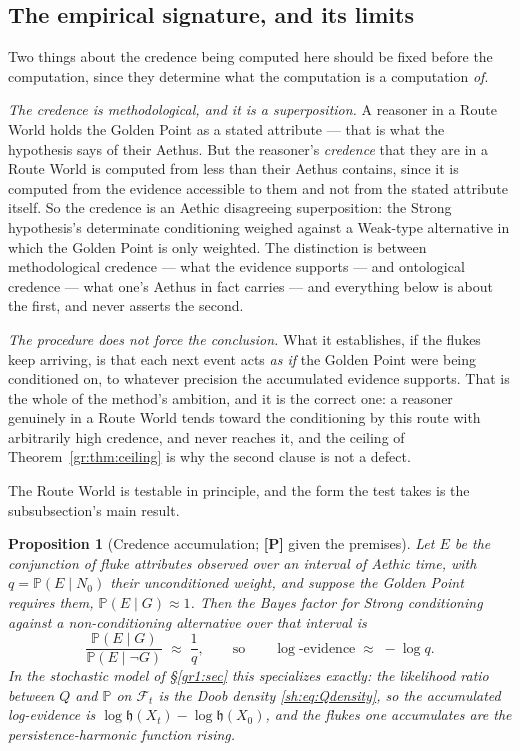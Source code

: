 \documentclass[11pt]{article}
\numberwithin{equation}{section}
\theoremstyle{plain}
\newtheorem{proposition}[theorem]{Proposition}
\theoremstyle{definition}
\theoremstyle{remark}
\newcommand{\PP}{\mathbb{P}}
\newcommand{\Fc}{\mathcal{F}}
\newcommand{\hm}{\mathfrak{h}}
\begin{document}
\subsection{The empirical signature, and its limits}\label{gc:sub:credencemethod}

Two things about the credence being computed here should be fixed before
the computation, since they determine what the computation is a
computation \emph{of}.

\emph{The credence is methodological, and it is a superposition.} A
reasoner in a Route World holds the Golden Point as a stated attribute
--- that is what the hypothesis says of their Aethus. But the reasoner's
\emph{credence} that they are in a Route World is computed from less
than their Aethus contains, since it is computed from the evidence
accessible to them and not from the stated attribute itself. So the
credence is an Aethic disagreeing superposition: the Strong hypothesis's
determinate conditioning weighed against a Weak-type alternative in which
the Golden Point is only weighted. The distinction is between
methodological credence --- what the evidence supports --- and
ontological credence --- what one's Aethus in fact carries --- and
everything below is about the first, and never asserts the second.

\emph{The procedure does not force the conclusion.} What it establishes,
if the flukes keep arriving, is that each next event acts \emph{as if}
the Golden Point were being conditioned on, to whatever precision the
accumulated evidence supports. That is the whole of the method's
ambition, and it is the correct one: a reasoner genuinely in a Route
World tends toward the conditioning by this route with arbitrarily high
credence, and never reaches it, and the ceiling of
Theorem~\ref{gr:thm:ceiling} is why the second clause is not a defect.

The Route World is testable in
principle, and the form the test takes is the subsubsection's main
result.

\begin{proposition}[Credence accumulation; \textbf{[P]} given the
premises]\label{gc:prop:credence}
Let $E$ be the conjunction of fluke attributes observed over an interval
of Aethic time, with $q=\PP(E\mid N_0)$ their unconditioned weight, and
suppose the Golden Point requires them, $\PP(E\mid G)\approx1$. Then the
Bayes factor for Strong conditioning against a non-conditioning
alternative over that interval is
\begin{equation}\label{gc:eq:bayesq}
\frac{\PP(E\mid G)}{\PP(E\mid \neg G)}\;\approx\;\frac1q,
\qquad\text{so}\qquad
\log\text{-evidence}\;\approx\;-\log q .
\end{equation}
In the stochastic model of \S\ref{gr1:sec} this specializes exactly:
the likelihood ratio between $Q$ and $\PP$ on $\Fc_t$ is the Doob
density \eqref{sh:eq:Qdensity}, so the accumulated log-evidence is
$\log\hm(X_t)-\log\hm(X_0)$, and \emph{the flukes one accumulates are
the persistence-harmonic function rising}.
\end{proposition}
\end{document}
